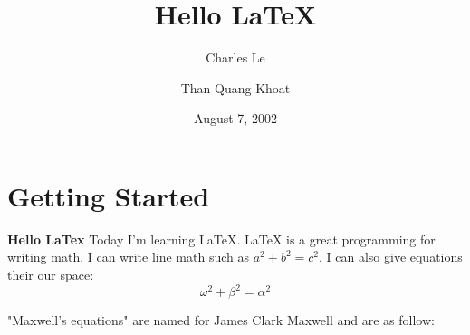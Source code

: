 \documentclass[15pt, a4paper]{article}
\title{Hello \LaTeX{}}
\author{Charles Le \and Than Quang Khoat}
\date{August 7, 2002}
\begin{document}
    \maketitle
    \section{Getting Started}
    \textbf{Hello LaTex} Today I'm learning \LaTeX{}. \LaTeX{} is a great programming for writing math. I can write line math such as $a^2 + b^2 = c^2$. I can also give equations their our space:
    \begin{equation}
        \omega^2 + \beta^2 = \alpha^2
    \end{equation}
    
    
    "Maxwell's equations" are named for James Clark Maxwell and are as follow:
    
\end{document}
